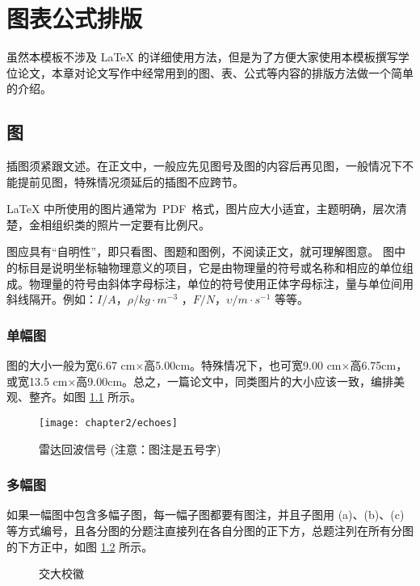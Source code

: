
\chapter{图表公式排版}%

虽然本模板不涉及 \LaTeX{} 的详细使用方法，但是为了方便大家使用本模板撰写学位论文，本章对论文写作中经常用到的{\hei 图、表、公式}等内容的排版方法做一个简单的介绍。

\section{图}%

插图须紧跟文述。在正文中，一般应先见图号及图的内容后再见图，一般情况下不能提前见图，特殊情况须延后的插图不应跨节。

\LaTeX{} 中所使用的图片通常为~PDF~格式，图片应大小适宜，主题明确，层次清楚，金相组织类的照片一定要有比例尺。

图应具有“自明性”，即只看图、图题和图例，不阅读正文，就可理解图意。
图中的标目是说明坐标轴物理意义的项目，它是由物理量的符号或名称和相应的单位组成。物理量的符号由斜体字母标注，单位的符号使用正体字母标注，量与单位间用斜线隔开。例如：$I / A$，$\rho / kg \cdot m^{-3}$ ，$F/N$，$\upsilon / m \cdot s^{-1} $ 等等。
\subsection{单幅图}%

图的大小一般为宽6.67 cm×高5.00cm。特殊情况下，也可宽9.00 cm×高6.75cm，或宽13.5 cm×高9.00cm。总之，一篇论文中，同类图片的大小应该一致，编排美观、整齐。如图 \ref{fig_ch2_echoes} 所示。
\begin{figure}[!ht]
	\centering
	\texttt{[image: chapter2/echoes]}
	\caption{雷达回波信号 ({\color{red}注意}：图注是五号字)} \label{fig_ch2_echoes}
\end{figure}

\subsection{多幅图}%

如果一幅图中包含多幅子图，每一幅子图都要有图注，并且子图用 (a)、(b)、(c) 等方式编号，且各分图的分题注直接列在各自分图的正下方，总题注列在所有分图的下方正中，如图 \ref{fig_ch2_badge} 所示。
\begin{figure}[!ht]
	\centering
	 \hfill
	\caption{交大校徽 \label{fig_ch2_badge}}
\end{figure}

